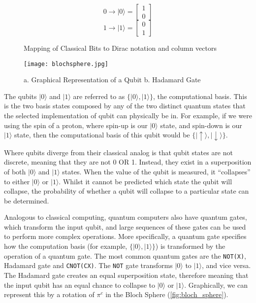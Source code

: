 \begin{figure}[H]
	\centering
	\[ 0 \rightarrow | 0 \rangle = \begin{bmatrix} 1 \\ 0 \end{bmatrix} \]
	\vspace{-0.2cm}
	\[ 1 \rightarrow | 1 \rangle = \begin{bmatrix} 0 \\ 1 \end{bmatrix} \]
	\caption*{Mapping of Classical Bits to Dirac notation \cite{dirac_notation} and column vectors}
\end{figure}

\begin{figure}[H]
	\centering
	\texttt{[image: blochsphere.jpg]}
	\caption{a. Graphical Representation of a Qubit b. Hadamard Gate \cite{present_landscape_q}}
	\label{fig:bloch_sphere}
\end{figure}

The qubits $|0\rangle$ and $|1\rangle $ are referred to as $\{|0\rangle, |1\rangle\}$, the computational basis. This is the two basis states composed by any of the two distinct quantum states that the selected implementation of qubit can physically be in. For example, if we were using the spin \cite{quantum_spin} of a proton, where spin-up is our $|0\rangle$ state, and spin-down is our $|1\rangle$ state, then the computational basis of this qubit would be $\{|\uparrow\rangle, |\downarrow\rangle\}$.

Where qubits diverge from their classical analog is that qubit states are not discrete, meaning that they are not 0 OR 1. Instead, they exist in a superposition \cite{superposition} of both $|0\rangle$ and $|1\rangle$ states. When the value of the qubit is measured, it ``collapses'' to either $|0\rangle$ or $|1\rangle$. Whilst it cannot be predicted which state the qubit will collapse, the probability of whether a qubit will collapse to a particular state can be determined.

Analogous to classical computing, quantum computers also have quantum gates, which transform the input qubit, and large sequences of these gates can be used to perform more complex operations. More specifically, a quantum gate specifies how the computation basis (for example, $\{|0\rangle, |1\rangle\}$) is transformed by the operation of a quantum gate. The most common quantum gates are the \texttt {NOT(X)}, Hadamard gate and \texttt {CNOT(CX)}. The \texttt {NOT} gate transforms $|0\rangle$ to $|1\rangle$, and vice versa. The Hadamard gate creates an equal superposition state, therefore meaning that the input qubit has an equal chance to collapse to $|0\rangle$ or $|1\rangle$. Graphically, we can represent this by a rotation of $\pi^c$ in the Bloch Sphere \cite{bloch_sphere} (\autoref{fig:bloch_sphere}).


